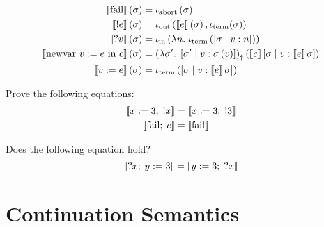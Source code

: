 \begin{enumcirc}
\begin{align*}
		\left\llbracket \textrm{fail} \right\rrbracket \left( \sigma \right)            & =
		\iota_{\textrm{abort}}\left( \sigma \right)                                                                              \\
		\left\llbracket \textrm{!} e \right\rrbracket \left( \sigma \right)          & =
		\iota_{\textrm{out}}\left( \left\llbracket e \right\rrbracket\left( \sigma \right), \iota_{\textrm{term}}{\left( \sigma \right)} \right)                                   \\
		\left\llbracket \textrm{?} v \right\rrbracket \left( \sigma \right)           & =
		\iota_{\textrm{in}}\left( \lambda n.\; \iota_{\textrm{term}}\left( \left[ \sigma \; \middle\vert \; v:n \right] \right) \right)                                           \\
		\left\llbracket \textrm{newvar } v := e \textrm{ in } c \right\rrbracket \left( \sigma \right)    & =
		\left( \lambda \sigma^\prime .\; \left[ \sigma^\prime \; \middle\vert \; v:\sigma\left( v \right) \right] \right)_\dagger
		\left( \left\llbracket c \right\rrbracket \left[ \sigma \; \middle\vert \; v: \left\llbracket e \right\rrbracket{\sigma} \right] \right)                                       \\
		\left\llbracket v := e \right\rrbracket \left( \sigma \right)    & =
		\iota_{\textrm{term}}\left( \left[ \sigma \; \middle\vert \; v: \left\llbracket e \right\rrbracket{\sigma} \right] \right)
	\end{align*}
	\begin{exercise}
		Prove the following equations:
		\begin{align*}
			\left\llbracket x := 3 ;\; \textrm{!} x \right\rrbracket & = \left\llbracket x := 3 ;\; \textrm{!} 3 \right\rrbracket \\
			\left\llbracket \textrm{fail} ;\; c \right\rrbracket                & = \left\llbracket \textrm{fail} \right\rrbracket                          \\
		\end{align*}
	\end{exercise}
	\begin{exercise}
		Does the following equation hold?
		\[
			\left\llbracket \textrm{?} x ;\; y := 3 \right\rrbracket = \left\llbracket y := 3 ;\; \textrm{?} x \right\rrbracket
		\]
	\end{exercise}
\end{enumcirc}

\section{Continuation Semantics}

